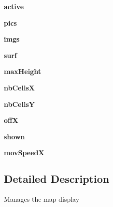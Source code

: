 \begin{DoxyCompactItemize}
\item 
\hypertarget{classpgcli_1_1_map_view_a9dd1d95351231ebed4c1f1c626d42ae4}{{\bfseries active}}\label{classpgcli_1_1_map_view_a9dd1d95351231ebed4c1f1c626d42ae4}

\item 
\hypertarget{classpgcli_1_1_map_view_aceb6e8e3eb2c355cc9e00fbb8f51e057}{{\bfseries pics}}\label{classpgcli_1_1_map_view_aceb6e8e3eb2c355cc9e00fbb8f51e057}

\item 
\hypertarget{classpgcli_1_1_map_view_ac4f4c91edad039d90f5c6c25be4da6fa}{{\bfseries imgs}}\label{classpgcli_1_1_map_view_ac4f4c91edad039d90f5c6c25be4da6fa}

\item 
\hypertarget{classpgcli_1_1_map_view_a197f6b06db5dc938782e3c55f7e7f063}{{\bfseries surf}}\label{classpgcli_1_1_map_view_a197f6b06db5dc938782e3c55f7e7f063}

\item 
\hypertarget{classpgcli_1_1_map_view_ae152df7460aed6a28aa3c519e4b66fd5}{{\bfseries max\-Height}}\label{classpgcli_1_1_map_view_ae152df7460aed6a28aa3c519e4b66fd5}

\item 
\hypertarget{classpgcli_1_1_map_view_a45e1f1ca06447b36e6b5e6988c768047}{{\bfseries nb\-Cells\-X}}\label{classpgcli_1_1_map_view_a45e1f1ca06447b36e6b5e6988c768047}

\item 
\hypertarget{classpgcli_1_1_map_view_a43e2a83bf51bb0a2816d91abe8193587}{{\bfseries nb\-Cells\-Y}}\label{classpgcli_1_1_map_view_a43e2a83bf51bb0a2816d91abe8193587}

\item 
\hypertarget{classpgcli_1_1_map_view_afc3ff6e88c0586a7b90d0ed6e6784ec7}{{\bfseries off\-X}}\label{classpgcli_1_1_map_view_afc3ff6e88c0586a7b90d0ed6e6784ec7}

\item 
\hypertarget{classpgcli_1_1_map_view_a795817a33d6493f86fa14b74339aad28}{{\bfseries shown}}\label{classpgcli_1_1_map_view_a795817a33d6493f86fa14b74339aad28}

\item 
\hypertarget{classpgcli_1_1_map_view_a6c53e95e5c83558862cdd5032107a89b}{{\bfseries mov\-Speed\-X}}\label{classpgcli_1_1_map_view_a6c53e95e5c83558862cdd5032107a89b}

\end{DoxyCompactItemize}


\subsection{\-Detailed \-Description}
\begin{DoxyVerb}Manages the map display \end{DoxyVerb}
 

